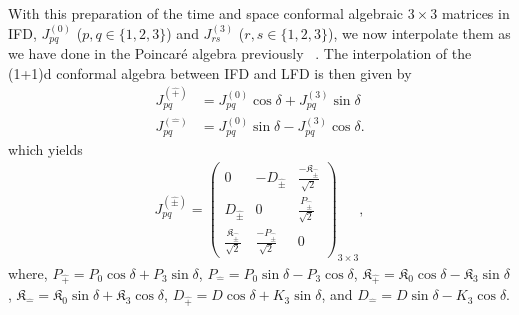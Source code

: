 \documentclass[%
 reprint,
superscriptaddress,
 amsmath,amssymb,
 aps,
]{revtex4-2}
\begin{document}
With this preparation of the time and space conformal algebraic $3\times3$ matrices in IFD, $J^{(0)}_{pq}$ ($p,q\in\{1,2,3\}$) and $J^{(3)}_{rs}$ ($r,s\in\{1,2,3\}$), we now interpolate them as we have done in the Poincar\'e algebra previously~ \cite{Ji2001, Ji2025}. The interpolation of the (1+1)d conformal algebra  between IFD and LFD is then given by  
\begin{align}
    J^{(\hat{+})}_{pq}&=J^{(0)}_{pq}\cos{\delta}+J^{(3)}_{pq}\sin{\delta}\\
    J^{(\hat{-})}_{pq}&=J^{(0)}_{pq}\sin{\delta}-J^{(3)}_{pq}\cos{\delta}.
\end{align}
which yields
\begin{align}
    J^{(\hat{\pm})}_{pq}=
  \begin{pmatrix}
  0&-D_{\hat{\pm}}&\frac{-\mathfrak{K}_{\hat{\pm}}}{\sqrt{2}}\\
  D_{\hat{\pm}}&0&\frac{P_{\hat{\pm}}}{\sqrt{2}}\\
    \frac{\mathfrak{K}_{\hat{\pm}}}{\sqrt{2}}&\frac{-P_{\hat{\pm}}}{\sqrt{2}}&0  
  \end{pmatrix}_{3\times3},
\end{align}
where, $P_{\hat{+}}=P_0\cos{\delta}+P_3\sin{\delta}$, $P_{\hat{-}}=P_0\sin{\delta}-P_3\cos{\delta}$, $\mathfrak{K}_{\hat{+}}=\mathfrak{K}_0\cos{\delta}-\mathfrak{K}_3\sin{\delta}$,  $\mathfrak{K}_{\hat{-}}=\mathfrak{K}_0\sin{\delta}+\mathfrak{K}_3\cos{\delta}$, $D_{\hat{+}}=D\cos\delta+K_{3}\sin\delta$, and $D_{\hat{-}}=D\sin\delta-K_{3}\cos\delta$. 
\end{document}
